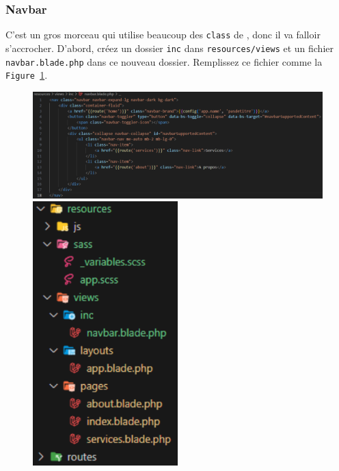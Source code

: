 \subsubsection[Navbar]{Navbar}

C'est un gros morceau qui utilise beaucoup des \verb|class| de \bs{}, donc il va falloir s'accrocher. D'abord, créez un dossier \verb|inc| dans \verb|resources/views| et un fichier \verb|navbar.blade.php| dans ce nouveau dossier. Remplissez ce fichier comme la \texttt{Figure~\ref{fig:navbar}}.

\begin{figure}[!h]
    \centering
    \begin{minipage}{0.7\textwidth}
         \centering
         \includegraphics[width=\textwidth]{figures-C1/navbar.pdf}
         \caption{\label{fig:navbar}}
    \end{minipage}
    \begin{minipage}{0.28\textwidth}
         \centering
         \includegraphics[width=0.5\textwidth]{figures-C1/navbar_file.pdf}
         \caption{}
    \end{minipage}
\end{figure}


